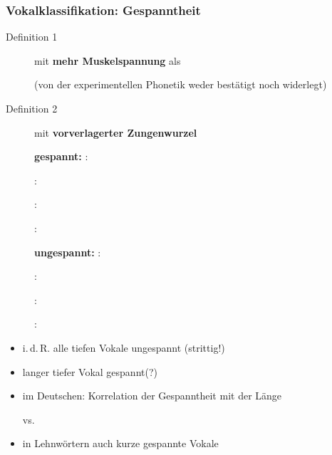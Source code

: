 \begin{frame}
\frametitle{Vokalklassifikation: Gespanntheit}

\begin{description}
	\item[Definition 1] \textipa{[ i:, y:, u:, o: ]} mit \textbf{mehr Muskelspannung} als \textipa{[ i:, y:, u:, o: ]} 
	
	(von der experimentellen Phonetik weder bestätigt noch widerlegt)
	
	\item[Definition 2] \textipa{[ i:, y:, u:, o: ]}  mit \textbf{vorverlagerter Zungenwurzel}


	\begin{multicols}{2}

	\textbf{gespannt:}
			\ea \textipa{[ i: ]}: 
			
			\ex \textipa{[ y: ]}: 
			
			\ex \textipa{[ u: ]}: 
			
			\ex \textipa{[ o: ]}: 
			
			\z 
		
\columnbreak
		
		\textbf{ungespannt:}
			\ea \textipa{[ I ]}: 
			
			\ex \textipa{[ Y ]}: 
			
			\ex \textipa{[ U ]}: 
			
			\ex \textipa{[ O ]}: 
			
			\z
		
	\end{multicols}

\end{description}
			
\end{frame}		

			
\begin{frame}			
		\begin{itemize}	
			\item i.\,d.\,R. alle tiefen Vokale \ras ungespannt (strittig!)
			\item langer tiefer Vokal \textipa{[ a: ]} \ras gespannt(?)

	      \item im Deutschen: Korrelation der Gespanntheit mit der Länge

		\ea \textipa{[ m i: t @ ]} vs. \textipa{[ m I t @ ]}
		\z

		\item in Lehnwörtern auch kurze gespannte Vokale

		\ea \textipa{[ P i . d e: ]}
		\z
		
	\end{itemize}
	
\end{frame}


